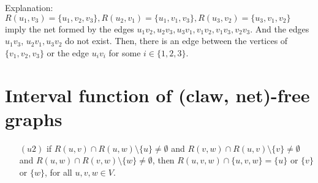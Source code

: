 \documentclass[10pt,a4paper]{article}
\begin{document}
Explanation: $R(u_1,v_3) = \{u_1,v_2,v_3\}, R(u_2,v_1) = \{u_1,v_1,v_3\}, R(u_3,v_2) = \{u_3,v_1,v_2\}$ imply the net formed by the edges $u_1v_2, u_2v_3, u_3v_1, v_1v_2, v_1v_3, v_2v_3$. And the edges $u_1v_3$, $u_2v_1, u_3v_2$ do not exist. Then, there is an edge between the vertices of $\{v_1,v_2,v_3\}$ or the edge $u_iv_i$ for some $i \in \{1,2,3\}$.


\section{Interval function of (claw, net)-free graphs }

\begin{itemize}
\item[$(u2)$] if $R(u,v)\cap R(u,w)\setminus \{u\}\neq\emptyset$ and $R(v,w)\cap R(u,v)\setminus \{v\}\neq\emptyset$ and $R(u,w)\cap R(v,w)\setminus \{w\}\neq\emptyset$, then $R(u,v,w)\cap \{u,v,w\}=\{u\}$ or $\{v\}$ or $\{w\}$, for all $u,v,w\in V $.
\end{itemize}
\end{document}
